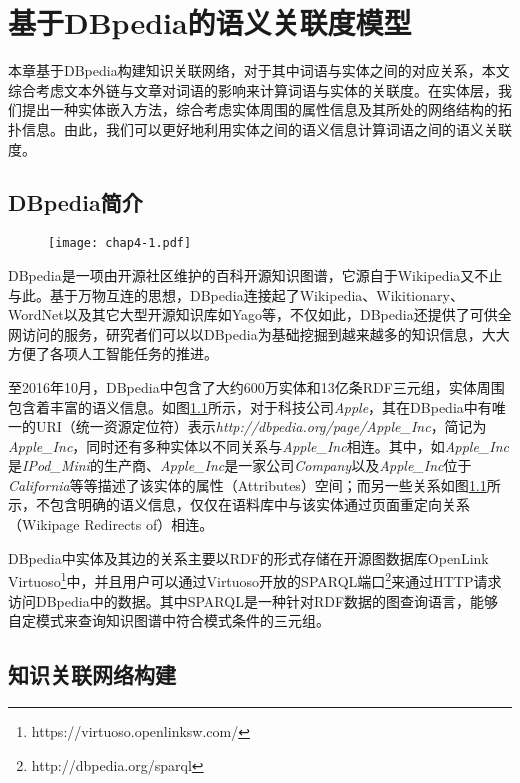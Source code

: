 \chapter{基于DBpedia的语义关联度模型}
\label{chap:chap04}

本章基于DBpedia构建知识关联网络，对于其中词语与实体之间的对应关系，本文综合考虑文本外链与文章对词语的影响来计算词语与实体的关联度。在实体层，我们提出一种实体嵌入方法，综合考虑实体周围的属性信息及其所处的网络结构的拓扑信息。由此，我们可以更好地利用实体之间的语义信息计算词语之间的语义关联度。

\section{DBpedia简介}

\begin{figure}[!ht]
    \centerline{\texttt{[image: chap4-1.pdf]}}
    \label{chap4-1}
\end{figure}

DBpedia是一项由开源社区维护的百科开源知识图谱，它源自于Wikipedia又不止与此。基于万物互连的思想，DBpedia连接起了Wikipedia、Wikitionary、WordNet以及其它大型开源知识库如Yago等，不仅如此，DBpedia还提供了可供全网访问的服务，研究者们可以以DBpedia为基础挖掘到越来越多的知识信息，大大方便了各项人工智能任务的推进。

至2016年10月，DBpedia中包含了大约600万实体和13亿条RDF三元组，实体周围包含着丰富的语义信息。如图\ref{chap4-1}所示，对于科技公司\emph{Apple}，其在DBpedia中有唯一的URI（统一资源定位符）表示\emph{http://dbpedia.org/page/Apple\_Inc}，简记为\emph{Apple\_Inc}，同时还有多种实体以不同关系与\emph{Apple\_Inc}相连。其中，如\emph{Apple\_Inc}是\emph{IPod\_Mini}的生产商、\emph{Apple\_Inc}是一家公司\emph{Company}以及\emph{Apple\_Inc}位于\emph{California}等等描述了该实体的属性（Attributes）空间；而另一些关系如图\ref{chap4-1}所示，不包含明确的语义信息，仅仅在语料库中与该实体通过页面重定向关系（Wikipage Redirects of）相连。

DBpedia中实体及其边的关系主要以RDF的形式存储在开源图数据库OpenLink Virtuoso\footnote{https://virtuoso.openlinksw.com/}中，并且用户可以通过Virtuoso开放的SPARQL端口\footnote{http://dbpedia.org/sparql}来通过HTTP请求访问DBpedia中的数据。其中SPARQL是一种针对RDF数据的图查询语言，能够自定模式来查询知识图谱中符合模式条件的三元组。


\section{知识关联网络构建}

